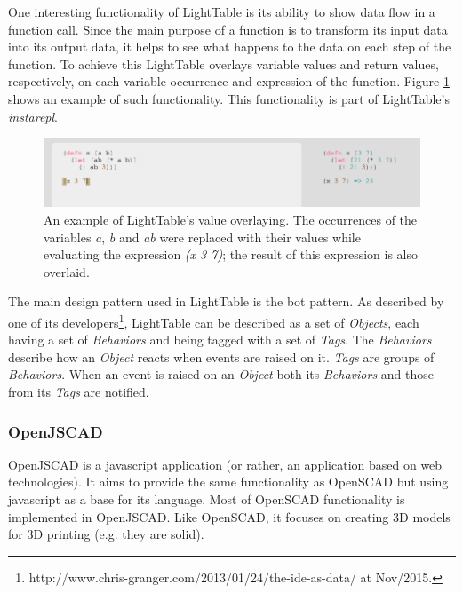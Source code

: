 \documentclass{./llncs2e/llncs}
\begin{document}
	One interesting functionality of LightTable is its ability to show data flow in a function call. 
	Since the main purpose of a function is to transform its input data into its output data, it helps to see what happens to the data on each step of the function. 
	To achieve this LightTable overlays variable values and return values, respectively, on each variable occurrence and expression of the function. 
	Figure \ref{fig:lt:val:overlay} shows an example of such functionality. 
	This functionality is part of LightTable's \emph{instarepl}.

	\begin{figure}
		\centering
		\includegraphics[width=1.0\textwidth]{img/lt_val_overlay__inv}
			\caption{An example of LightTable's value overlaying. The occurrences of the variables \emph{a}, \emph{b} and \emph{ab} were replaced with their values while evaluating the expression \emph{(x 3 7)}; the result of this expression is also overlaid.}
		\label{fig:lt:val:overlay}
	\end{figure}

	The main design pattern used in LightTable is the \ac{bot} pattern. 
	As described by one of its developers\footnote{http://www.chris-granger.com/2013/01/24/the-ide-as-data/ at Nov/2015.}, LightTable can be described as a set of \emph{Objects}, each having a set of \emph{Behaviors} and being tagged with a set of \emph{Tags}. 
	The \emph{Behaviors} describe how an \emph{Object} reacts when events are raised on it. \emph{Tags} are groups of \emph{Behaviors}. 
	When an event is raised on an \emph{Object} both its \emph{Behaviors} and those from its \emph{Tags} are notified.

\subsubsection{OpenJSCAD\cite{openjscad2015site}}
	OpenJSCAD is a javascript application (or rather, an application based on web technologies).
	It aims to provide the same functionality as OpenSCAD but using javascript as a base for its language. 
	Most of OpenSCAD functionality is implemented in OpenJSCAD. 
	Like OpenSCAD, it focuses on creating 3D models for 3D printing (e.g. they are solid).
\end{document}
